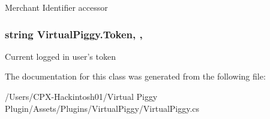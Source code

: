 Merchant Identifier accessor 

\hypertarget{class_virtual_piggy_a27549028a152d40ddf293705da935a9b}{
\subsubsection[{Token}]{\setlength{\rightskip}{0pt plus 5cm}string Virtual\-Piggy.\-Token\hspace{0.3cm}{\ttfamily [static]}, {\ttfamily [get]}, {\ttfamily [set]}}}\label{class_virtual_piggy_a27549028a152d40ddf293705da935a9b}


Current logged in user's token 



The documentation for this class was generated from the following file\-:\begin{DoxyCompactItemize}
\item 
/\-Users/\-C\-P\-X-\/\-Hackintosh01/\-Virtual Piggy Plugin/\-Assets/\-Plugins/\-Virtual\-Piggy/Virtual\-Piggy.\-cs\end{DoxyCompactItemize}
